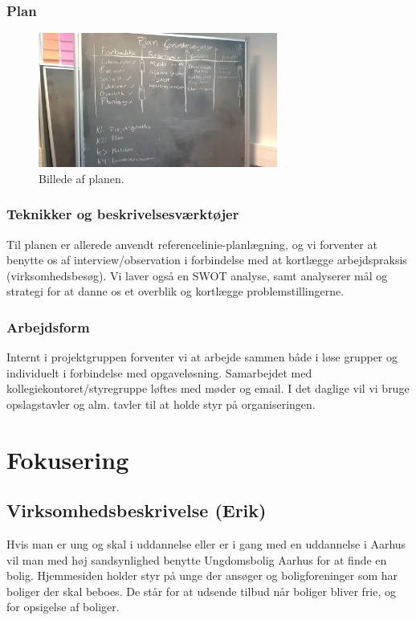 \documentclass[12pt, a4paper]{report}
\begin{document}
\subsubsection{Plan}
\begin{figure}[ht!]
\centering
\includegraphics[width=0.7\textwidth]{forundersoegelsesplan.jpg}
\caption{Billede af planen.}
\end{figure}

\subsubsection{Teknikker og beskrivelsesværktøjer}
Til planen er allerede anvendt referencelinie-planlægning, og vi forventer at benytte os af interview/observation i forbindelse med at kortlægge arbejdspraksis (virksomhedsbesøg). Vi laver også en SWOT analyse, samt analyserer mål og strategi for at danne os et overblik og kortlægge problemstillingerne.

\subsubsection{Arbejdsform}
Internt i projektgruppen forventer vi at arbejde sammen både i løse grupper og individuelt i forbindelse med opgaveløsning. Samarbejdet med kollegiekontoret/styregruppe løftes med møder og email.
I det daglige vil vi bruge opslagstavler og alm. tavler til at holde styr på organiseringen.

\section{Fokusering}
\subsection{Virksomhedsbeskrivelse (Erik)}
Hvis man er ung og skal i uddannelse eller er i gang med en uddannelse i Aarhus vil man med høj sandsynlighed benytte Ungdomsbolig Aarhus for at finde en bolig. Hjemmesiden holder styr på unge der ansøger og boligforeninger som har boliger der skal beboes. De står for at udsende tilbud når boliger bliver frie, og for opsigelse af boliger.
\end{document}
